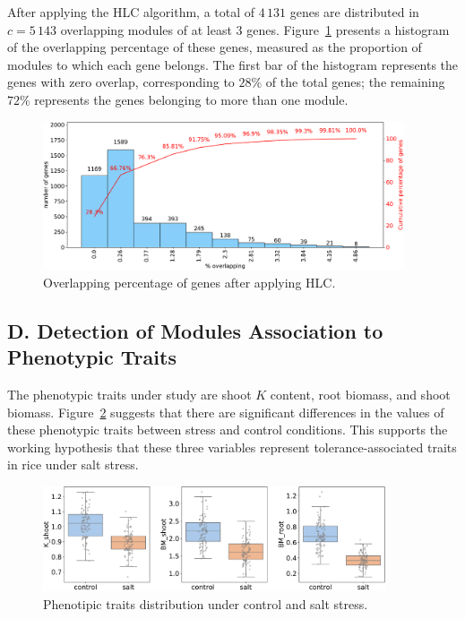 After applying the HLC algorithm, a total of $4\,131$ genes are
distributed in $c = 5\,143$ overlapping modules of at least $3$
genes. Figure~\ref{fig:overlap} presents a histogram of the
overlapping percentage of these genes, measured as the proportion of
modules to which each gene belongs. The first bar of the histogram
represents the genes with zero overlap, corresponding to $28\%$ of the
total genes; the remaining $72\%$ represents the genes belonging to
more than one module.

\begin{figure}[htbp]
  \centering
    \includegraphics[clip,width=0.95\textwidth]{figures/figure3.pdf}
  \caption{Overlapping percentage of genes after applying HLC.}
  \label{fig:overlap}
\end{figure}

\subsection*{D. Detection of Modules Association to Phenotypic Traits}

The phenotypic traits under study are shoot $K$ content, root
biomass, and shoot biomass. Figure~\ref{fig:pdata} suggests that there
are significant differences in the values of these phenotypic traits
between stress and control conditions. This supports the working
hypothesis that these three variables represent tolerance-associated
traits in rice under salt stress.
\vspace{0.5cm}

\begin{figure}[htbp]
  \centering
    \includegraphics[clip,width=0.9\textwidth]{figures/figure4.pdf}
  \caption{Phenotipic traits distribution under control and salt stress.}
  \label{fig:pdata}
\end{figure}

